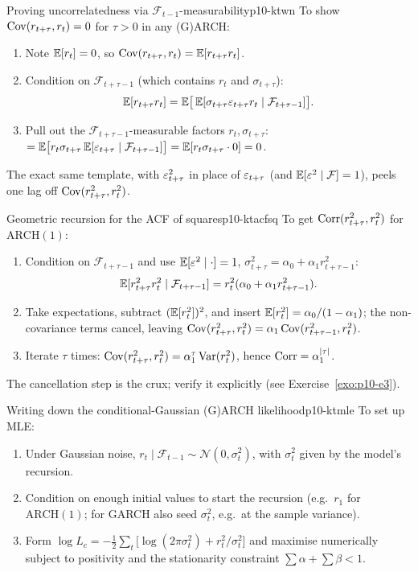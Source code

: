 \begin{keytech}{Proving uncorrelatedness via $\mathcal F_{t-1}$-measurability}{p10-ktwn}
To show $\operatorname{Cov}(r_{t+\tau},r_t)=0$ for $\tau>0$ in any (G)ARCH:
\begin{enumerate}
  \item Note $\mathbb{E}[r_t]=0$, so $\operatorname{Cov}(r_{t+\tau},r_t)=\mathbb{E}[r_{t+\tau}r_t]$.
  \item Condition on $\mathcal F_{t+\tau-1}$ (which contains $r_t$ and $\sigma_{t+\tau}$):
        \[
        \mathbb{E}[r_{t+\tau}r_t]=\mathbb{E}\big[\,\mathbb{E}[\sigma_{t+\tau}\varepsilon_{t+\tau}r_t\mid\mathcal F_{t+\tau-1}]\big].
        \]
  \item Pull out the $\mathcal F_{t+\tau-1}$-measurable factors $r_t,\sigma_{t+\tau}$:
        $=\mathbb{E}\big[r_t\sigma_{t+\tau}\,\mathbb{E}[\varepsilon_{t+\tau}\mid\mathcal F_{t+\tau-1}]\big]
        =\mathbb{E}[r_t\sigma_{t+\tau}\cdot0]=0$.
\end{enumerate}
The exact same template, with $\varepsilon_{t+\tau}^2$ in place of $\varepsilon_{t+\tau}$ (and
$\mathbb{E}[\varepsilon^2\mid\mathcal F]=1$), peels one lag off $\operatorname{Cov}(r_{t+\tau}^2,r_t^2)$.
\end{keytech}

\begin{keytech}{Geometric recursion for the ACF of squares}{p10-ktacfsq}
To get $\operatorname{Corr}(r_{t+\tau}^2,r_t^2)$ for $\mathrm{ARCH}(1)$:
\begin{enumerate}
  \item Condition on $\mathcal F_{t+\tau-1}$ and use $\mathbb{E}[\varepsilon^2\mid\cdot]=1$,
        $\sigma_{t+\tau}^2=\alpha_0+\alpha_1 r_{t+\tau-1}^2$:
        \[
        \mathbb{E}[r_{t+\tau}^2 r_t^2\mid\mathcal F_{t+\tau-1}]
        =r_t^2(\alpha_0+\alpha_1 r_{t+\tau-1}^2).
        \]
  \item Take expectations, subtract $(\mathbb{E}[r_t^2])^2$, and insert
        $\mathbb{E}[r_t^2]=\alpha_0/(1-\alpha_1)$; the non-covariance terms cancel,
        leaving $\operatorname{Cov}(r_{t+\tau}^2,r_t^2)=\alpha_1\operatorname{Cov}(r_{t+\tau-1}^2,r_t^2)$.
  \item Iterate $\tau$ times: $\operatorname{Cov}(r_{t+\tau}^2,r_t^2)=\alpha_1^{\tau}\operatorname{Var}(r_t^2)$,
        hence $\operatorname{Corr}=\alpha_1^{\left\lvert \tau \right\rvert}$.
\end{enumerate}
The cancellation step is the crux; verify it explicitly (see
Exercise~\ref{exo:p10-e3}).
\end{keytech}

\begin{keytech}{Writing down the conditional-Gaussian (G)ARCH likelihood}{p10-ktmle}
To set up MLE:
\begin{enumerate}
  \item Under Gaussian noise, $r_t\mid\mathcal F_{t-1}\sim\mathcal N(0,\sigma_t^2)$,
        with $\sigma_t^2$ given by the model's recursion.
  \item Condition on enough initial values to start the recursion (e.g.\ $r_1$
        for $\mathrm{ARCH}(1)$; for GARCH also seed $\sigma_t^2$, e.g.\ at the
        sample variance).
  \item Form $\log L_c=-\tfrac12\sum_{t}\big[\log(2\pi\sigma_t^2)+r_t^2/\sigma_t^2\big]$
        and maximise numerically subject to positivity and the stationarity
        constraint $\sum\alpha+\sum\beta<1$.
\end{enumerate}
\end{keytech}

